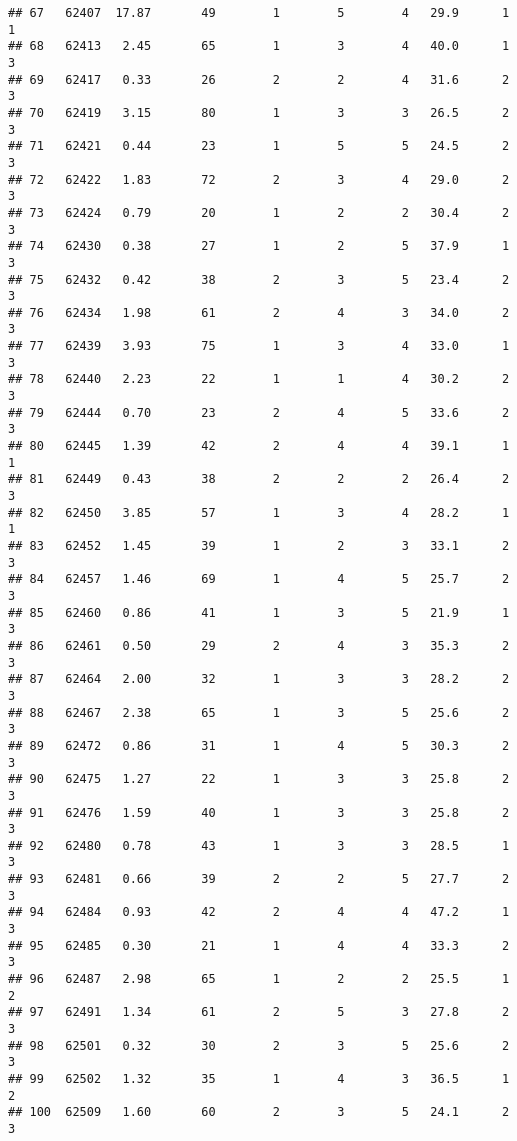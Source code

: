 \documentclass[
]{article}
\begin{document}
\begin{verbatim}
## 67   62407  17.87       49        1        5        4   29.9      1      1
## 68   62413   2.45       65        1        3        4   40.0      1      3
## 69   62417   0.33       26        2        2        4   31.6      2      3
## 70   62419   3.15       80        1        3        3   26.5      2      3
## 71   62421   0.44       23        1        5        5   24.5      2      3
## 72   62422   1.83       72        2        3        4   29.0      2      3
## 73   62424   0.79       20        1        2        2   30.4      2      3
## 74   62430   0.38       27        1        2        5   37.9      1      3
## 75   62432   0.42       38        2        3        5   23.4      2      3
## 76   62434   1.98       61        2        4        3   34.0      2      3
## 77   62439   3.93       75        1        3        4   33.0      1      3
## 78   62440   2.23       22        1        1        4   30.2      2      3
## 79   62444   0.70       23        2        4        5   33.6      2      3
## 80   62445   1.39       42        2        4        4   39.1      1      1
## 81   62449   0.43       38        2        2        2   26.4      2      3
## 82   62450   3.85       57        1        3        4   28.2      1      1
## 83   62452   1.45       39        1        2        3   33.1      2      3
## 84   62457   1.46       69        1        4        5   25.7      2      3
## 85   62460   0.86       41        1        3        5   21.9      1      3
## 86   62461   0.50       29        2        4        3   35.3      2      3
## 87   62464   2.00       32        1        3        3   28.2      2      3
## 88   62467   2.38       65        1        3        5   25.6      2      3
## 89   62472   0.86       31        1        4        5   30.3      2      3
## 90   62475   1.27       22        1        3        3   25.8      2      3
## 91   62476   1.59       40        1        3        3   25.8      2      3
## 92   62480   0.78       43        1        3        3   28.5      1      3
## 93   62481   0.66       39        2        2        5   27.7      2      3
## 94   62484   0.93       42        2        4        4   47.2      1      3
## 95   62485   0.30       21        1        4        4   33.3      2      3
## 96   62487   2.98       65        1        2        2   25.5      1      2
## 97   62491   1.34       61        2        5        3   27.8      2      3
## 98   62501   0.32       30        2        3        5   25.6      2      3
## 99   62502   1.32       35        1        4        3   36.5      1      2
## 100  62509   1.60       60        2        3        5   24.1      2      3

\end{verbatim}
\end{document}
